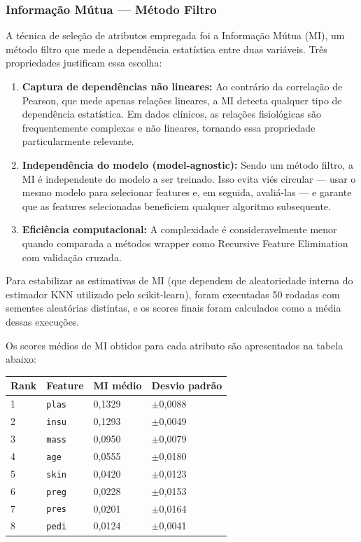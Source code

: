 \documentclass[12pt]{article}
\begin{document}
\subsubsection{Informação Mútua --- Método Filtro}

A técnica de seleção de atributos empregada foi a Informação Mútua (MI), um método filtro que mede a dependência estatística entre duas variáveis. Três propriedades justificam essa escolha:

\begin{enumerate}
\item \textbf{Captura de dependências não lineares:} Ao contrário da correlação de Pearson, que mede apenas relações lineares, a MI detecta qualquer tipo de dependência estatística. Em dados clínicos, as relações fisiológicas são frequentemente complexas e não lineares, tornando essa propriedade particularmente relevante.
\item \textbf{Independência do modelo (model-agnostic):} Sendo um método filtro, a MI é independente do modelo a ser treinado. Isso evita viés circular --- usar o mesmo modelo para selecionar features e, em seguida, avaliá-las --- e garante que as features selecionadas beneficiem qualquer algoritmo subsequente.
\item \textbf{Eficiência computacional:} A complexidade é consideravelmente menor quando comparada a métodos wrapper como Recursive Feature Elimination com validação cruzada.

\end{enumerate}
Para estabilizar as estimativas de MI (que dependem de aleatoriedade interna do estimador KNN utilizado pelo scikit-learn), foram executadas 50 rodadas com sementes aleatórias distintas, e os scores finais foram calculados como a média dessas execuções.

Os scores médios de MI obtidos para cada atributo são apresentados na tabela abaixo:

\begin{table}[ht]
\centering
\begin{tabularx}{\textwidth}{|l|X|X|X|}
\hline
Rank & Feature & MI médio & Desvio padrão \\
\hline
1 & \texttt{plas} & 0,1329 & $\pm$0,0088 \\
\hline
2 & \texttt{insu} & 0,1293 & $\pm$0,0049 \\
\hline
3 & \texttt{mass} & 0,0950 & $\pm$0,0079 \\
\hline
4 & \texttt{age} & 0,0555 & $\pm$0,0180 \\
\hline
5 & \texttt{skin} & 0,0420 & $\pm$0,0123 \\
\hline
6 & \texttt{preg} & 0,0228 & $\pm$0,0153 \\
\hline
7 & \texttt{pres} & 0,0201 & $\pm$0,0164 \\
\hline
8 & \texttt{pedi} & 0,0124 & $\pm$0,0041 \\
\hline
\end{tabularx}
\end{table}
\end{document}
